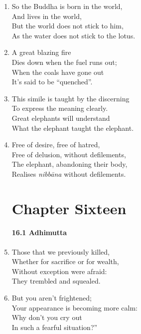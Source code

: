 \documentclass[10pt, openany]{book}
\newcommand*{\vleftofline}[1]{\leavevmode\llap{#1}}
\begin{document}
\begin{enumerate}
\item So the Buddha is born in the world,\\
And lives in the world,\\
But the world does not stick to him,\\
As the water does not stick to the lotus.

\item A great blazing fire\\
Dies down when the fuel runs out;\\
When the coals have gone out\\
It’s said to be “quenched”.

\item This simile is taught by the discerning\\
To express the meaning clearly.\\
Great elephants will understand\\
What the elephant taught the elephant.

\item Free of desire, free of hatred,\\
Free of delusion, without defilements,\\
The elephant, abandoning their body,\\
Realises \emph{nibbāna} without defilements.

\chapter*{Chapter Sixteen}

\subsubsection*{16.1 Adhimutta}

\item \vleftofline{“}Those that we previously killed,\\
Whether for sacrifice or for wealth,\\
Without exception were afraid:\\
They trembled and squealed.

\item But you aren’t frightened;\\
Your appearance is becoming more calm:\\
Why don’t you cry out\\
In such a fearful situation?”


\end{enumerate}
\end{document}
